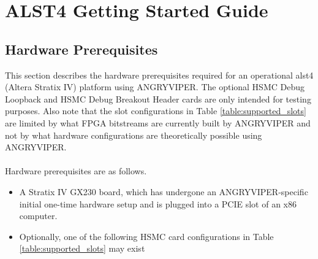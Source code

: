 \documentclass{article}
\begin{document}
\section*{ALST4 Getting Started Guide}
\subsection*{Hardware Prerequisites}
This section describes the hardware prerequisites required for an operational alst4 (Altera Stratix IV) platform using ANGRYVIPER. The optional HSMC Debug Loopback and HSMC Debug Breakout Header cards are only intended for testing purposes. Also note that the slot configurations in Table \ref{table:supported_slots} are limited by what FPGA bitstreams are currently built by ANGRYVIPER and not by what hardware configurations are theoretically possible using ANGRYVIPER.\\ \\
Hardware prerequisites are as follows.
\begin{itemize}
\item A Stratix IV GX230 board, which has undergone an ANGRYVIPER-specific initial one-time hardware setup \cite{alst4_hardware_setup} and is plugged into a PCIE slot of an x86 computer.
\item Optionally, one of the following HSMC card configurations in Table  \ref{table:supported_slots} may exist
\end{itemize}
\end{document}
